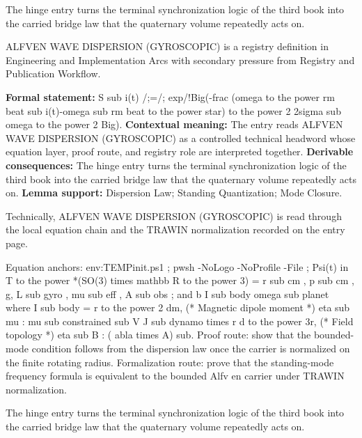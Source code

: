 The hinge entry turns the terminal synchronization logic of the third book into the carried bridge law that the quaternary volume repeatedly acts on.
\clearpage


\begingroup\small
{}
ALFVEN WAVE DISPERSION (GYROSCOPIC) is a registry definition in Engineering and Implementation Arcs with secondary pressure from Registry and Publication Workflow.

\begingroup\footnotesize\setlength{\emergencystretch}{3em}\sloppy
\textbf{Formal statement:} S sub i(t) /;=/; exp/!Big(-frac (omega to the power rm beat sub i(t)-omega sub rm beat to the power star) to the power 2 2sigma sub omega to the power 2 Big). \textbf{Contextual meaning:} The entry reads ALFVEN WAVE DISPERSION (GYROSCOPIC) as a controlled technical headword whose equation layer, proof route, and registry role are interpreted together. \textbf{Derivable consequences:} The hinge entry turns the terminal synchronization logic of the third book into the carried bridge law that the quaternary volume repeatedly acts on. \textbf{Lemma support:} Dispersion Law; Standing Quantization; Mode Closure.\par
\endgroup

Technically, ALFVEN WAVE DISPERSION (GYROSCOPIC) is read through the local equation chain and the TRAWIN normalization recorded on the entry page.

Equation anchors: env:TEMPinit.ps1 ; pwsh -NoLogo -NoProfile -File ; Psi(t) in T to the power *(SO(3) times mathbb R to the power 3) = r sub cm , p sub cm , g, L sub gyro , mu sub eff , A sub obs ; and b   I sub body omega sub planet where I sub body =     r to the power 2 dm, (* Magnetic dipole moment *) eta sub mu : mu sub constrained     sub V J sub dynamo times r d to the power 3r, (* Field topology *) eta sub B : ( abla times A) sub. Proof route: show that the bounded-mode condition follows from the dispersion law once the carrier is normalized on the finite rotating radius. Formalization route: prove that the standing-mode frequency formula is equivalent to the bounded Alfv en carrier under TRAWIN normalization.

The hinge entry turns the terminal synchronization logic of the third book into the carried bridge law that the quaternary volume repeatedly acts on.
\endgroup


